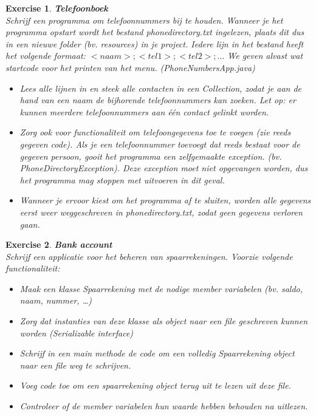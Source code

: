\documentclass[a4paper, 12pt]{report}
\newenvironment{boxexercise}
{\begin{tcolorbox}
[enhanced jigsaw,breakable,pad at break*=1mm,
 colback=tsyellow!20,boxrule=0pt,frame hidden]}
{\end{tcolorbox}}
\newtheorem{envoefening}{\textbf{Exercise}}[chapter]
\newenvironment{oefening}
               {\begin{boxexercise}\begin{envoefening}}
               {\end{envoefening}\end{boxexercise}}
\begin{document}
\begin{oefening}
\textbf{Telefoonboek}\\

Schrijf een programma om telefoonnummers bij te houden.
Wanneer je het programma opstart wordt het bestand phonedirectory.txt ingelezen,
plaats dit dus in een nieuwe folder (bv. resources) in je project. Iedere lijn in het
bestand heeft het volgende formaat: $<naam>;<tel1>;<tel2>;…$
We geven alvast wat startcode voor het printen van het menu.
(PhoneNumbersApp.java)
\begin{itemize}
\item Lees alle lijnen in en steek alle contacten in een Collection, zodat je aan de hand van
een naam de bijhorende telefoonnummers kan zoeken. Let op: er kunnen meerdere
telefoonnummers aan één contact gelinkt worden.
\item Zorg ook voor functionaliteit om telefoongegevens toe te voegen (zie reeds gegeven
code). Als je een telefoonnummer toevoegt dat reeds bestaat voor de gegeven
persoon, gooit het programma een zelfgemaakte exception. (bv.
PhoneDirectoryException). Deze exception moet niet opgevangen worden, dus het
programma mag stoppen met uitvoeren in dit geval.
\item Wanneer je ervoor kiest om het programma af te sluiten, worden alle gegevens eerst
weer weggeschreven in phonedirectory.txt, zodat geen gegevens verloren gaan.
\end{itemize}
\end{oefening}

\begin{oefening}
\textbf{Bank account}\\

Schrijf een applicatie voor het beheren van spaarrekeningen.
Voorzie volgende functionaliteit:
\begin{itemize}
\item Maak een klasse Spaarrekening met de nodige member variabelen (bv. saldo,
naam, nummer, …)
\item Zorg dat instanties van deze klasse als object naar een file geschreven kunnen
worden (Serializable interface)
\item Schrijf in een main methode de code om een volledig Spaarrekening object
naar een file weg te schrijven.
\item Voeg code toe om een spaarrekening object terug uit te lezen uit deze file.
\item Controleer of de member variabelen hun waarde hebben behouden na uitlezen.
\end{itemize}
\end{oefening}
\end{document}
